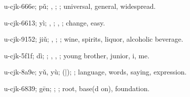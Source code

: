 \begin{multicols}{2}
{\cjkgGlue{}u-cjk-666e; pǔ; \cjkgGlue{}\cjkgGlue{}\cjkgGlue{}, \cjkgGlue{}; \cjkgGlue{}; universal, general, widespread.

\cjkgGlue{}u-cjk-6613; yì; \cjkgGlue{}\cjkgGlue{}\cjkgGlue{}, \cjkgGlue{}\cjkgGlue{}\cjkgGlue{}; \cjkgGlue{}, \cjkgGlue{}; change, easy.

\cjkgGlue{}u-cjk-9152; jiǔ; \cjkgGlue{}, \cjkgGlue{}; \cjkgGlue{}; wine, spirits, liquor, alcoholic beverage.

\cjkgGlue{}u-cjk-5f1f; dì; \cjkgGlue{}; \cjkgGlue{}, \cjkgGlue{}, \cjkgGlue{}; young brother, junior, i, me.

\cjkgGlue{}u-cjk-8a9e; yǔ, yù; \cjkgGlue{}\cjkgGlue{}(\cjkgGlue{}|\cjkgGlue{}); \cjkgGlue{}; language, words, saying, expression.

\cjkgGlue{}u-cjk-6839; gēn; \cjkgGlue{}; \cjkgGlue{}; root, base(d on), foundation.

}
\end{multicols}
